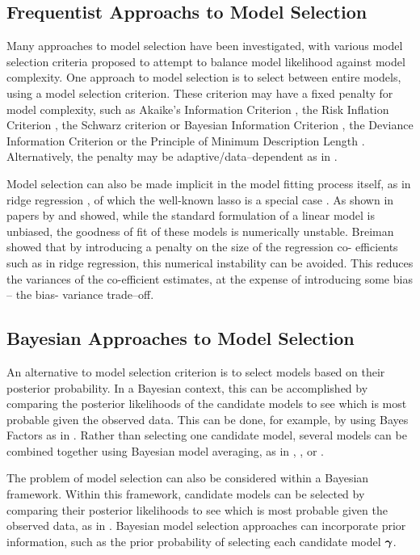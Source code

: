 \documentclass{amsart}[12pt]
\begin{document}
\subsection{Frequentist Approachs to Model Selection}
Many approaches to model selection have been investigated, with various model selection criteria proposed to
attempt to balance model likelihood against model complexity. One approach to model selection is to select
between entire models, using a model selection criterion. These criterion may have a fixed penalty for model
complexity, such as Akaike's Information Criterion \citep{Akaike1974}, the Risk Inflation Criterion
\citep{Foster1994}, the Schwarz criterion or Bayesian Information Criterion \citep{Schwarz1978}, the Deviance
Information Criterion \citep{Spiegelhalter2016} or the Principle of Minimum Description Length
\citep{Hansen2001}. Alternatively, the penalty may be adaptive/data--dependent as in \citep{George2000}.

Model selection can also be made implicit in the model fitting process itself, as in ridge regression
\citep{Casella1980}, of which the well-known lasso is a special case \citep{Tibshirani1996}. As shown in
papers by \citep{Breiman1996} and \citep{Efron2013} showed, while  the standard formulation of a linear model
is unbiased, the goodness of fit of these models is numerically  unstable. Breiman showed that by introducing
a penalty on the size of the regression co- efficients such as  in ridge regression, this numerical
instability can be avoided. This reduces the variances of the co-efficient estimates, at the expense of
introducing some bias -- the bias- variance trade--off.

\subsection{Bayesian Approaches to Model Selection}
An alternative to model selection criterion is to select models based on their posterior probability. In a
Bayesian context, this can be accomplished by comparing the posterior likelihoods of the candidate models to
see which is most probable given the observed data. This can be done, for example, by using Bayes Factors as
in \citep{Kass1993}. Rather than selecting one candidate model, several models can be combined together using
Bayesian model averaging, as in \citep{Hoeting1999}, \citep{Raftery1997}, \citep{Fernandez2001} or
\citep{Papaspiliopoulos2016}.

The problem of model selection can also be considered within a Bayesian framework.
Within this framework, candidate models can be selected by comparing their posterior likelihoods to see
which is most probable given the observed data, as in \citep{Kass1993}. Bayesian model selection approaches
can incorporate prior information, such as the prior probability of selecting each candidate model ${\boldsymbol \gamma}$.
\end{document}

